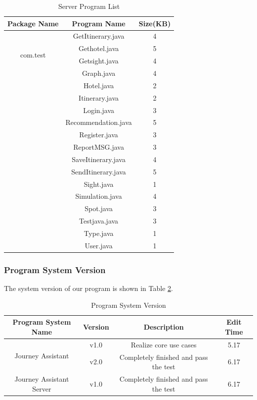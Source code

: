 \documentclass[10pt]{article}
\begin{document}
\begin{table}[htb]
	\centering

	\begin{tabular}{|c|c|c|}
		\hline
		Package Name&Program Name &Size(KB)\\
		\hline
		\multirow{4}{*}{com.test}
		&GetItinerary.java &4 \\
		\cline{2-3}
		&Gethotel.java &5 \\
		\cline{2-3}
		&Getsight.java &4 \\
		\cline{2-3}
		&Graph.java &4 \\
		\cline{2-3}
		&Hotel.java &2 \\
		\cline{2-3}
		&Itinerary.java &2 \\
		\cline{2-3}
		&Login.java &3 \\
		\cline{2-3}
		&Recommendation.java &5 \\
		\cline{2-3}
		&Register.java &3 \\
		\cline{2-3}
		&ReportMSG.java &3 \\
		\cline{2-3}
		&SaveItinerary.java &4 \\
		\cline{2-3}
		&SendItinerary.java &5 \\
		\cline{2-3}
		&Sight.java &1 \\
		\cline{2-3}
		&Simulation.java &4 \\
		\cline{2-3}
		&Spot.java &3 \\
		\cline{2-3}
		&Testjava.java &3 \\
		\cline{2-3}
		&Type.java &1 \\
		\cline{2-3}
		&User.java &1 \\
		\hline
		\end{tabular}
	\caption{Server Program List}
	\label{Server Program List}		
\end{table}

\subsubsection{Program System Version}
The system version of our program is shown in Table \ref{Program System Version}.

\begin{table}[htb]
	\centering

	\begin{tabular}{|c|c|c|c|}
		\hline
		Program System Name& Version &Description & Edit Time \\
		\hline
		\multirow{2}{*}{Journey Assistant}
		&v1.0 &Realize core use cases &5.17\\
		\cline{2-4}
		&v2.0 &Completely finished and pass the test & 6.17 \\
		\hline
		Journey Assistant Server& v1.0 & Completely finished and pass the test & 6.17\\
		\hline
		\end{tabular}
	\caption{Program System Version}
	\label{Program System Version}
\end{table}
\end{document}

